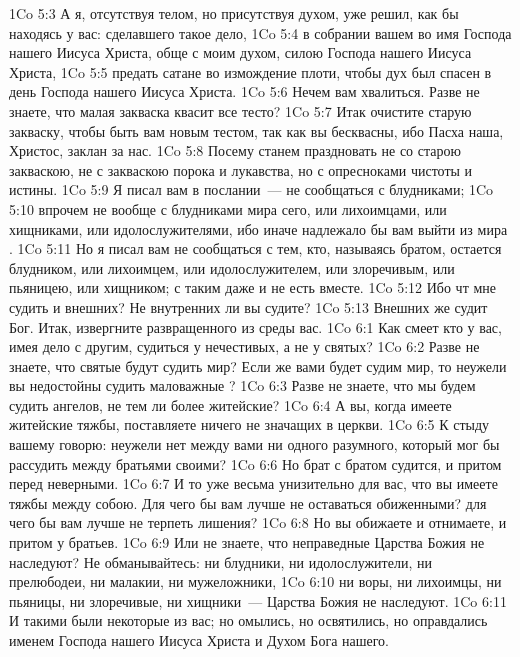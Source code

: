 \vs 1Co 5:3 А я, отсутствуя телом, но присутствуя  духом, уже решил, как бы находясь у вас: сделавшего такое дело,
\vs 1Co 5:4 в собрании вашем во имя Господа нашего Иисуса Христа, обще с моим духом, силою Господа нашего Иисуса Христа,
\vs 1Co 5:5 предать сатане во измождение плоти, чтобы дух был спасен в день Господа нашего Иисуса Христа.
\vs 1Co 5:6 Нечем вам хвалиться. Разве не знаете, что малая закваска квасит все тесто?
\vs 1Co 5:7 Итак очистите старую закваску, чтобы быть вам новым тестом, так как вы бесквасны, ибо Пасха наша, Христос, заклан за нас.
\vs 1Co 5:8 Посему станем праздновать не со старою закваскою, не с закваскою порока и лукавства, но с опресноками чистоты и истины.
\rsbpar\vs 1Co 5:9 Я писал вам в послании~--- не сообщаться с блудниками;
\vs 1Co 5:10 впрочем не вообще с блудниками мира сего, или лихоимцами, или хищниками, или идолослужителями, ибо иначе надлежало бы вам выйти из мира .
\vs 1Co 5:11 Но я писал вам не сообщаться с тем, кто, называясь братом, остается блудником, или лихоимцем, или идолослужителем, или злоречивым, или пьяницею, или хищником; с таким даже и не есть вместе.
\vs 1Co 5:12 Ибо чт мне судить и внешних? Не внутренних ли вы судите?
\vs 1Co 5:13 Внешних же судит Бог. Итак, извергните развращенного из среды вас.
\vs 1Co 6:1 Как смеет кто у вас, имея дело с другим, судиться у нечестивых, а не у святых?
\vs 1Co 6:2 Разве не знаете, что святые будут судить мир? Если же вами будет судим мир, то неужели вы недостойны судить маловажные ?
\vs 1Co 6:3 Разве не знаете, что мы будем судить ангелов, не тем ли более  житейские?
\vs 1Co 6:4 А вы, когда имеете житейские тяжбы, поставляете  ничего не значащих в церкви.
\vs 1Co 6:5 К стыду вашему говорю: неужели нет между вами ни одного разумного, который мог бы рассудить между братьями своими?
\vs 1Co 6:6 Но брат с братом судится, и притом перед неверными.
\vs 1Co 6:7 И то уже весьма унизительно для вас, что вы имеете тяжбы между собою. Для чего бы вам лучше не оставаться обиженными? для чего бы вам лучше не терпеть лишения?
\vs 1Co 6:8 Но вы  обижаете и отнимаете, и притом у братьев.
\vs 1Co 6:9 Или не знаете, что неправедные Царства Божия не наследуют? Не обманывайтесь: ни блудники, ни идолослужители, ни прелюбодеи, ни малакии, ни мужеложники,
\vs 1Co 6:10 ни воры, ни лихоимцы, ни пьяницы, ни злоречивые, ни хищники~--- Царства Божия не наследуют.
\vs 1Co 6:11 И такими были некоторые из вас; но омылись, но освятились, но оправдались именем Господа нашего Иисуса Христа и Духом Бога нашего.
